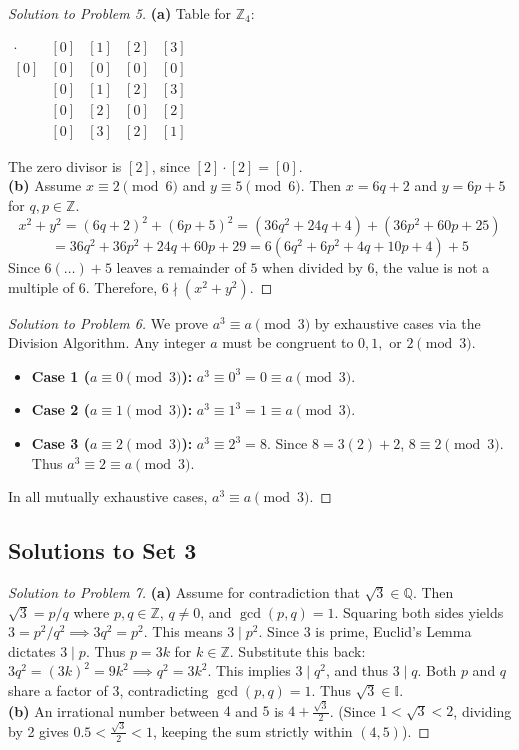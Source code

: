 \documentclass{article}
\begin{document}
\begin{proof}[Solution to Problem 5]
\textbf{(a)} Table for $\mathbb{Z}_4$:
\begin{center}
$
\begin{array}{c|cccc}
\cdot & [0] & [1] & [2] & [3] \\
\hline
[0] & [0] & [0] & [0] & [0] \\
[1] & [0] & [1] & [2] & [3] \\
[2] & [0] & [2] & [0] & [2] \\
[3] & [0] & [3] & [2] & [1] 
\end{array}
$
\end{center}
The zero divisor is $[2]$, since $[2] \cdot [2] = [0]$. \\
\textbf{(b)} Assume $x \equiv 2 \pmod 6$ and $y \equiv 5 \pmod 6$. Then $x = 6q+2$ and $y = 6p+5$ for $q, p \in \mathbb{Z}$.
\[ x^2 + y^2 = (6q+2)^2 + (6p+5)^2 = (36q^2 + 24q + 4) + (36p^2 + 60p + 25) \]
\[ = 36q^2 + 36p^2 + 24q + 60p + 29 = 6(6q^2 + 6p^2 + 4q + 10p + 4) + 5 \]
Since $6(\dots) + 5$ leaves a remainder of $5$ when divided by $6$, the value is not a multiple of $6$. Therefore, $6 \nmid (x^2+y^2)$.
\end{proof}

\begin{proof}[Solution to Problem 6]
We prove $a^3 \equiv a \pmod 3$ by exhaustive cases via the Division Algorithm. Any integer $a$ must be congruent to $0, 1,$ or $2 \pmod 3$.
\begin{itemize}
    \item \textbf{Case 1 ($a \equiv 0 \pmod 3$):} $a^3 \equiv 0^3 = 0 \equiv a \pmod 3$.
    \item \textbf{Case 2 ($a \equiv 1 \pmod 3$):} $a^3 \equiv 1^3 = 1 \equiv a \pmod 3$.
    \item \textbf{Case 3 ($a \equiv 2 \pmod 3$):} $a^3 \equiv 2^3 = 8$. Since $8 = 3(2) + 2$, $8 \equiv 2 \pmod 3$. Thus $a^3 \equiv 2 \equiv a \pmod 3$.
\end{itemize}
In all mutually exhaustive cases, $a^3 \equiv a \pmod 3$. 
\end{proof}

\subsection{Solutions to Set 3}
\begin{proof}[Solution to Problem 7]
\textbf{(a)} Assume for contradiction that $\sqrt{3} \in \mathbb{Q}$. Then $\sqrt{3} = p/q$ where $p,q \in \mathbb{Z}$, $q \neq 0$, and $\gcd(p,q)=1$. Squaring both sides yields $3 = p^2/q^2 \implies 3q^2 = p^2$. This means $3 \mid p^2$. Since $3$ is prime, Euclid's Lemma dictates $3 \mid p$. Thus $p = 3k$ for $k \in \mathbb{Z}$. Substitute this back: $3q^2 = (3k)^2 = 9k^2 \implies q^2 = 3k^2$. This implies $3 \mid q^2$, and thus $3 \mid q$. Both $p$ and $q$ share a factor of $3$, contradicting $\gcd(p,q)=1$. Thus $\sqrt{3} \in \mathbb{I}$. \\
\textbf{(b)} An irrational number between $4$ and $5$ is $4 + \frac{\sqrt{3}}{2}$. (Since $1 < \sqrt{3} < 2$, dividing by 2 gives $0.5 < \frac{\sqrt{3}}{2} < 1$, keeping the sum strictly within $(4,5)$).
\end{proof}
\end{document}
